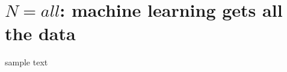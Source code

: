 \documentclass[book.tex]{subfiles}
\begin{document}
\chapter{$N = all$: machine learning gets all the data
}

sample text
\end{document}
